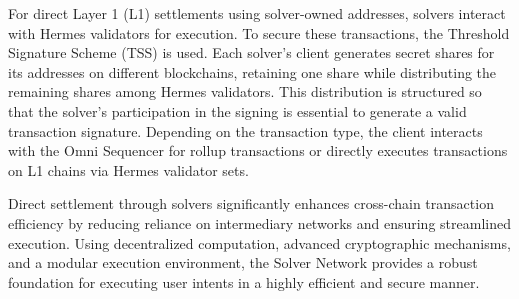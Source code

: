 For direct Layer 1 (L1) settlements using solver-owned addresses, solvers interact with Hermes validators for execution. To secure these transactions, the Threshold Signature Scheme (TSS) is used. Each solver’s client generates secret shares for its addresses on different blockchains, retaining one share while distributing the remaining shares among Hermes validators. This distribution is structured so that the solver's participation in the signing is essential to generate a valid transaction signature. Depending on the transaction type, the client interacts with the Omni Sequencer for rollup transactions or directly executes transactions on L1 chains via Hermes validator sets.

Direct settlement through solvers significantly enhances cross-chain transaction efficiency by reducing reliance on intermediary networks and ensuring streamlined execution. Using decentralized computation, advanced cryptographic mechanisms, and a modular execution environment, the Solver Network provides a robust foundation for executing user intents in a highly efficient and secure manner.

